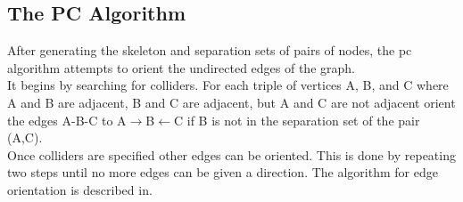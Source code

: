 \documentclass{article}
\begin{document}
\subsection{The PC Algorithm}
After generating the skeleton and separation sets of pairs of nodes, the pc algorithm attempts to orient the undirected edges of the graph.
\\

It begins by searching for colliders. For each triple of vertices A, B, and C where A and B are adjacent, B and C are adjacent, but A and C are not adjacent orient the edges A-B-C to A$\rightarrow$B$\leftarrow$C if B is not in the separation set of the pair (A,C).
\\

Once colliders are specified other edges can be oriented. This is done by repeating two steps until no more edges can be given a direction. The algorithm for edge orientation is described in.\\
\\
\end{document}
